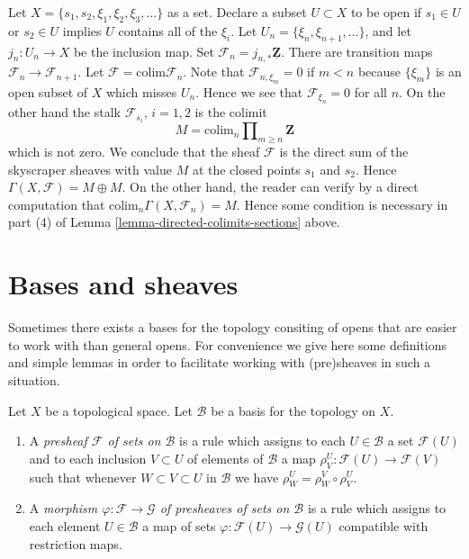\begin{example}
\label{example-conditions-needed-colimit}
Let $X = \{s_1, s_2, \xi_1, \xi_2, \xi_3, \ldots\}$ as a set.
Declare a subset $U \subset X$ to be open
if $s_1 \in U$ or $s_2 \in U$ implies $U$ contains all of the
$\xi_i$. Let $U_n = \{\xi_n, \xi_{n + 1}, \ldots\}$, and
let $j_n : U_n \to X$ be the inclusion map.
Set $\mathcal{F}_n = j_{n, *}\underline{\mathbf{Z}}$.
There are transition maps $\mathcal{F}_n \to \mathcal{F}_{n + 1}$.
Let $\mathcal{F} = \text{colim} \mathcal{F}_n$.
Note that $\mathcal{F}_{n, \xi_m} = 0$ if $m < n$
because $\{\xi_m\}$ is an open subset of $X$ which misses $U_n$.
Hence we see that $\mathcal{F}_{\xi_n} = 0$ for all $n$.
On the other hand the stalk $\mathcal{F}_{s_i}$, $i = 1, 2$
is the colimit
$$
M = \text{colim}_n \prod\nolimits_{m \geq n} \mathbf{Z}
$$
which is not zero. We conclude that the sheaf
$\mathcal{F}$ is the direct sum of the
skyscraper sheaves with value $M$ at the closed points
$s_1$ and $s_2$. Hence $\Gamma(X, \mathcal{F}) = M \oplus M$.
On the other hand, the reader can verify by a direct
computation that $\text{colim}_n \Gamma(X, \mathcal{F}_n) = M$.
Hence some condition is necessary in part (4)
of Lemma \ref{lemma-directed-colimits-sections} above.
\end{example}















\section{Bases and sheaves}
\label{section-bases}

\noindent
Sometimes there exists a bases for the topology
consiting of opens that are easier to work with
than general opens. For convenience we give here
some definitions and simple lemmas in order to
facilitate working with (pre)sheaves in such a situation.

\begin{definition}
\label{definition-presheaf-basis}
Let $X$ be a topological space. Let $\mathcal{B}$ be a
basis for the topology on $X$.
\begin{enumerate}
\item A {\it presheaf $\mathcal{F}$ of sets on $\mathcal{B}$}
is a rule which assigns to each $U \in \mathcal{B}$ a set
$\mathcal{F}(U)$ and to each inclusion $V \subset U$
of elements of $\mathcal{B}$ a map
$\rho^U_V : \mathcal{F}(U) \to \mathcal{F}(V)$ such that
whenever $W \subset V \subset U$ in $\mathcal{B}$ we have
$\rho^U_W = \rho^V_W \circ \rho ^U_V$.
\item A {\it morphism $\varphi : \mathcal{F} \to \mathcal{G}$
of presheaves of sets on $\mathcal{B}$} is a rule which assigns to each
element $U \in \mathcal{B}$ a map of sets $\varphi : \mathcal{F}(U)
\to \mathcal{G}(U)$ compatible with restriction maps.
\end{enumerate}
\end{definition}

